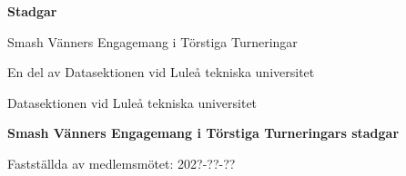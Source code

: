 \documentclass[12pt,a4paper]{article}
\begin{document}
\hypersetup{pageanchor=false}
\begin{titlepage}
	\thispagestyle{empty}
	\vspace*{4cm}
	\begin{center}
		{\Huge\bfseries Stadgar}

		\vspace{1cm}

		{\LARGE Smash Vänners Engagemang i Törstiga Turneringar}

		\vspace{0.5cm}

		{\large En del av Datasektionen vid Luleå tekniska universitet}
	\end{center}
	\vfill
	\begin{center}
		\large Datasektionen vid Luleå tekniska universitet
	\end{center}
\end{titlepage}

\hypersetup{pageanchor=true}
\begin{center}
	{\Large\bfseries Smash Vänners Engagemang i Törstiga Turneringars stadgar}

	\vspace{0.25cm}

	Fastställda av medlemsmötet: 202?-??-??
\end{center}
\vspace{0.5cm}
\tableofcontents
\newpage









\end{document}
